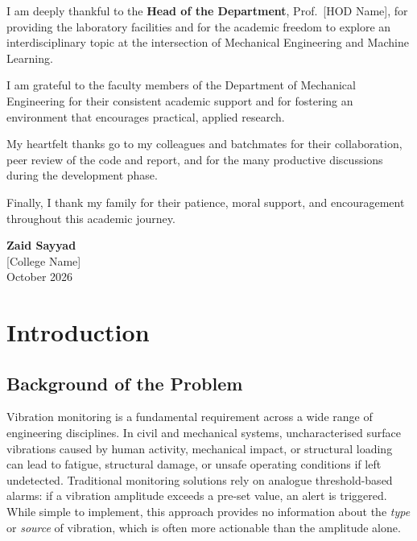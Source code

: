 \documentclass[12pt,a4paper]{report}
\begin{document}
I am deeply thankful to the \textbf{Head of the Department},
Prof.~[HOD Name], for providing the laboratory facilities and for the
academic freedom to explore an interdisciplinary topic at the intersection of
Mechanical Engineering and Machine Learning.

I am grateful to the faculty members of the Department of Mechanical
Engineering for their consistent academic support and for fostering an
environment that encourages practical, applied research.

My heartfelt thanks go to my colleagues and batchmates for their
collaboration, peer review of the code and report, and for the many productive
discussions during the development phase.

Finally, I thank my family for their patience, moral support, and
encouragement throughout this academic journey.

\vspace{1.5cm}
\hfill \textbf{Zaid Sayyad}\\
\hfill [College Name]\\
\hfill October 2026

\newpage

\tableofcontents
\newpage
\listoffigures
{}
\newpage
\listoftables
{}
\newpage

\setcounter{page}{1}

\chapter{Introduction}

\section{Background of the Problem}

Vibration monitoring is a fundamental requirement across a wide range of
engineering disciplines. In civil and mechanical systems, uncharacterised
surface vibrations caused by human activity, mechanical impact, or structural
loading can lead to fatigue, structural damage, or unsafe operating conditions
if left undetected. Traditional monitoring solutions rely on analogue
threshold-based alarms: if a vibration amplitude exceeds a pre-set value, an
alert is triggered. While simple to implement, this approach provides no
information about the \emph{type} or \emph{source} of vibration, which is
often more actionable than the amplitude alone.
\end{document}
